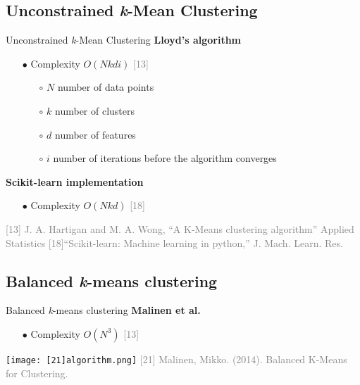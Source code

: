 \subsection{Unconstrained \textit{k}-Mean Clustering}
	\begin{frame}{Unconstrained \textit{k}-Mean Clustering}
		\textbf{Lloyd’s algorithm}
		\begin{itemize}
			\item[$\bullet$] Complexity $O(Nkdi)$ \textcolor{gray}{[13]}
			\begin{itemize}
				\item[$\circ$] $N$ number of data points
				\item[$\circ$] $k$ number of clusters 
				\item[$\circ$] $d$ number of features
				\item[$\circ$] $i$ number of iterations before the algorithm converges
			\end{itemize} 
		\end{itemize}
		\textbf{Scikit-learn implementation}
		\begin{itemize}
			\item[$\bullet$] Complexity $O(Nkd)$ \textcolor{gray}{[18]}
		\end{itemize}
		\bigbreak
		\tiny{ %
			\textcolor{gray}{
					[13] J. A. Hartigan and M. A. Wong, “A K-Means clustering algorithm” Applied Statistics 
			}
			\smallbreak
			\textcolor{gray}{
					[18]“Scikit-learn: Machine learning in python,” J. Mach. Learn. Res.
			}
		}
	\end{frame}

	


\subsection{Balanced \textit{k}-means clustering}
	\begin{frame}{Balanced \textit{k}-means clustering}
		\textbf{Malinen et al.}
		\begin{itemize}
			\item[$\bullet$] Complexity $O(N^3)$ \textcolor{gray}{[13]}
		\end{itemize}
		\texttt{[image: [21]algorithm.png]}
		\break
		\tiny{ %
			\textcolor{gray}{
				[21] Malinen, Mikko. (2014). Balanced K-Means for Clustering. 
			}
		}
	\end{frame}

